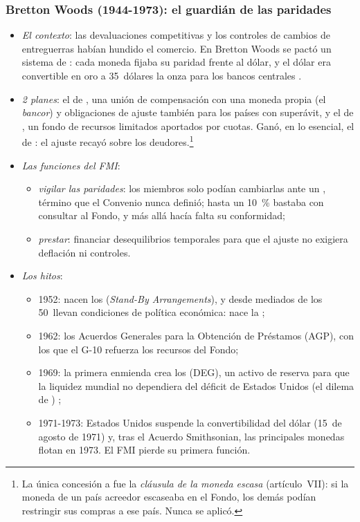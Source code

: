 \documentclass[11pt]{article}
\begin{document}
\subsubsection{Bretton Woods (1944-1973): el guardián de las paridades}\label{sec:bretton}

\begin{itemize}
\item \emph{El contexto}: las devaluaciones competitivas y los controles de cambios de entreguerras habían hundido el comercio. En Bretton Woods se pactó un sistema de : cada moneda fijaba su paridad frente al dólar, y el dólar era convertible en oro a 35~dólares la onza para los bancos centrales .
\item \emph{2 planes}: el de , una unión de compensación con una moneda propia (el \emph{bancor}) y obligaciones de ajuste también para los países con superávit, y el de , un fondo de recursos limitados aportados por cuotas. Ganó, en lo esencial, el de : el ajuste recayó sobre los deudores\nocite{Boughton2002WhiteKeynes}.\footnote{La única concesión a  fue la \emph{cláusula de la moneda escasa} (artículo~VII): si la moneda de un país acreedor escaseaba en el Fondo, los demás podían restringir sus compras a ese país. Nunca se aplicó.}
\item \emph{Las funciones del FMI}:
  \begin{itemize}
  \item \emph{vigilar las paridades}: los miembros solo podían cambiarlas ante un , término que el Convenio nunca definió; hasta un 10~\% bastaba con consultar al Fondo, y más allá hacía falta su conformidad;
  \item \emph{prestar}: financiar desequilibrios temporales para que el ajuste no exigiera deflación ni controles.
  \end{itemize}
\item \emph{Los hitos}:
  \begin{itemize}
  \item 1952: nacen los  (\emph{Stand-By Arrangements}), y desde mediados de los 50~llevan condiciones de política económica: nace la ;
  \item 1962: los Acuerdos Generales para la Obtención de Préstamos (AGP), con los que el G-10 refuerza los recursos del Fondo;
  \item 1969: la primera enmienda crea los  (DEG), un activo de reserva para que la liquidez mundial no dependiera del déficit de Estados Unidos (el dilema de ) ;
  \item 1971-1973: Estados Unidos suspende la convertibilidad del dólar (15~de agosto de 1971) y, tras el Acuerdo Smithsonian, las principales monedas flotan en 1973. El FMI pierde su primera función.
  \end{itemize}
\end{itemize}
\end{document}
